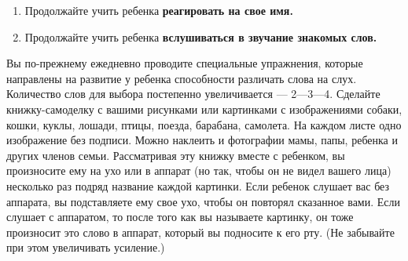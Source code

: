\documentclass{book}
\begin{document}
\begin{enumerate}
\def\labelenumi{\arabic{enumi}.}
\setcounter{enumi}{2}
\item
  
  Продолжайте учить ребенка \textbf{реагировать на свое имя.}
  
\item
  
  Продолжайте учить ребенка \textbf{вслушиваться в звучание знакомых
  слов.}
  
\end{enumerate}


Вы по-прежнему ежедневно проводите специальные упражнения, которые
направлены на развитие у ребенка способности различать слова на слух.
Количество слов для выбора постепенно увеличивается --- 2---3---4.
Сделайте книжку-самоделку с вашими рисунками или картинками с
изображениями собаки, кошки, куклы, лошади, птицы, поезда, барабана,
самолета. На каждом листе одно изображение без подписи. Можно наклеить и
фотографии мамы, папы, ребенка и других членов семьи. Рассматривая эту
книжку вместе с ребенком, вы произносите ему на ухо или в аппарат (но
так, чтобы он не видел вашего лица) несколько раз подряд название каждой
картинки. Если ребенок слушает вас без аппарата, вы подставляете ему
свое ухо, чтобы он повторял сказанное вами. Если слушает с аппаратом, то
после того как вы называете картинку, он тоже произносит это слово в
аппарат, который вы подносите к его рту. (Не забывайте при этом
увеличивать усиление.)
\end{document}
